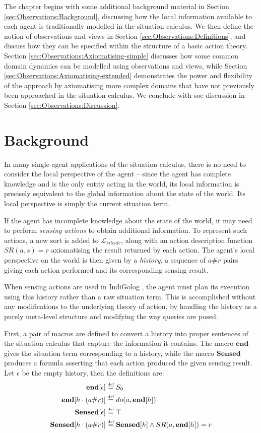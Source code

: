 The chapter begins with some additional background material in Section
\ref{sec:Observations:Background}, discussing how the local information
available to each agent is traditionally modelled in the situation
calculus. We then define the notion of observations and views in Section
\ref{sec:Observations:Definitions}, and discuss how they can be specified
within the structure of a basic action theory. Section \ref{sec:Observations:Axiomatising-simple}
discusses how some common domain dynamics can be modelled using observations
and views, while Section \ref{sec:Observations:Axiomatising-extended}
demonstrates the power and flexibility of the approach by axiomatising
more complex domains that have not previously been approached in the
situation calculus. We conclude with soe discussion in Section \ref{sec:Observations:Discussion}.


\section{Background\label{sec:Observations:Background}}

In many single-agent applications of the situation calculus, there
is no need to consider the local perspective of the agent -- since
the agent has complete knowledge and is the only entity acting in
the world, its local information is precisely equivalent to the global
information about the state of the world. Its local perspective is
simply the current situation term.

If the agent has incomplete knowledge about the state of the world,
it may need to perform \emph{sensing actions} to obtain additional
information. To represent such actions, a new sort is
added to $\mathcal{L}_{sitcalc}$, along with an action description
function $SR(a,s)=r$ axiomatising the result returned by each action.
The agent's local perspective on the world is then given by a \emph{history},
a sequence of $a\#r$ pairs giving each action performed and its corresponding
sensing result.

When sensing actions are used in IndiGolog \citep{giacomo99indigolog},
the agent must plan its execution using this history rather than a
raw situation term. This is accomplished without any modifications
to the underlying theory of action, by handling the history as a purely
meta-level structure and modifying the way queries are posed.

First, a pair of macros are defined to convert a history into proper
sentences of the situation calculus that capture the information it
contains. The macro $\mathbf{end}$ gives the situation term corresponding
to a history, while the macro $\mathbf{Sensed}$ produces a formula
asserting that each action produced the given sensing result. Let
$\epsilon$ be the empty history, then the definitions are:\begin{alignat*}{1}
\mathbf{end}[\epsilon] & \stackrel{\mbox{\tiny def}}{=} S_{0}\\
\mathbf{end}[h\cdot(a\#r)] & \stackrel{\mbox{\tiny def}}{=} do(a,\mathbf{end}[h])\\
\mathbf{Sensed}[\epsilon] & \stackrel{\mbox{\tiny def}}{=}\top\\
\mathbf{Sensed}[h\cdot(a\#r)] & \stackrel{\mbox{\tiny def}}{=}\mathbf{Sensed}[h]\wedge SR(a,\mathbf{end}[h])=r\end{alignat*}



